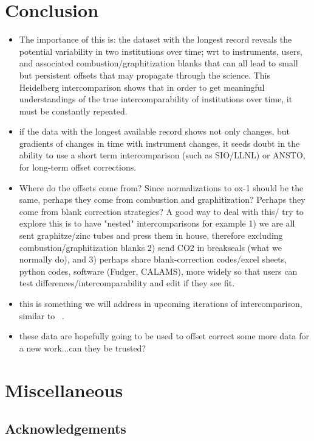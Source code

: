 \documentclass{article}
\begin{document}
\newpage
\section{Conclusion}
\begin{itemize}
	\item The importance of this is: the dataset with the longest record reveals the potential variability in two institutions over time; wrt to instruments, users, and associated combustion/graphitization blanks that can all lead to small but persistent offsets that may propagate through the science. This Heidelberg intercomparison shows that in order to get meaningful understandings of the true intercomparability of institutions over time, it must be constantly repeated. 
	\item if the data with the longest available record shows not only changes, but gradients of changes in time with instrument changes, it seeds doubt in the ability to use a short term intercomparison (such as SIO/LLNL) or ANSTO, for long-term offset corrections. 
	\item Where do the offsets come from? Since normalizations to ox-1 should be the same, perhaps they come from combustion and graphitization? Perhaps they come from blank correction strategies? A good way to deal with this/ try to explore this is to have "nested" intercomparisons for example 1) we are all sent graphitze/zinc tubes and press them in house, therefore excluding combustion/graphitization blanks 2) send CO2 in breakseals (what we normally do), and 3) perhaps share blank-correction codes/excel sheets, python codes, software (Fudger, CALAMS), more widely so that users can test differences/intercomparability and edit if they see fit. 
	\item this is something we will address in upcoming iterations of intercomparison, similar to ~\cite{miller2013}. 
    \item these data are hopefully going to be used to offset correct some more data for a new work...can they be trusted? 
    
\end{itemize}
\newpage
\section{Miscellaneous}
\subsection{Acknowledgements}
\end{document}
